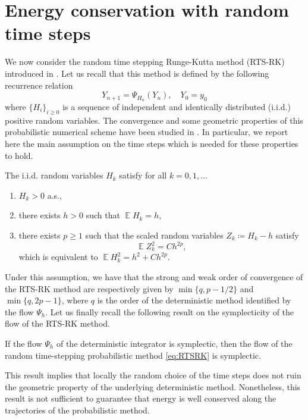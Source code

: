 \documentclass{siamart1116}
\numberwithin{theorem}{section}
\newcommand{\defeq}{\coloneqq}
\newcommand{\E}{\operatorname{\mathbb{E}}}
\begin{document}
\section{Energy conservation with random time steps}\label{sec:RTSBEA} We now consider the random time stepping Runge-Kutta method (RTS-RK) introduced in \cite{AbG18}. Let us recall that this method is defined by the following recurrence relation
\begin{equation}\label{eq:RTSRK}
	Y_{n+1} = \Psi_{H_n}(Y_n), \quad Y_0 = y_0
\end{equation}
where $\{H_i\}_{i\geq 0}$ is a sequence of independent and identically distributed (i.i.d.) positive random variables. The convergence and some geometric properties of this probabilistic numerical scheme have been studied in \cite{AbG18}. In particular, we report here the main assumption on the time steps which is needed for these properties to hold.
\begin{assumption}\label{as:AssumptionH} The i.i.d. random variables $H_k$ satisfy for all $k = 0, 1, \ldots$
	\begin{enumerate}
		\item\label{as:hStrong_Pos} $H_k > 0$ a.s.,
		\item\label{as:hStrong_E} there exists $h > 0$ such that $\E H_k = h$,
		\item\label{as:hStrong_Var} there exists $p \geq 1$ such that the scaled random variables $Z_k \defeq H_k - h$ satisfy
		\begin{equation}
		\E Z_k^2 = Ch^{2p},
		\end{equation}
		which is equivalent to $\E H_k^2 = h^2 + Ch^{2p}$.
	\end{enumerate}
\end{assumption}
Under this assumption, we have that the strong and weak order of convergence of the RTS-RK method are respectively given by $\min\{q, p-1/2\}$ and $\min\{q, 2p-1\}$, where $q$ is the order of the deterministic method identified by the flow $\Psi_h$. Let us finally recall the following result on the symplecticity of the flow of the RTS-RK method.
\begin{lemma}\label{lem:SympRTSRK} If the flow $\Psi_h$ of the deterministic integrator is symplectic, then the flow of the random time-stepping probabilistic method \eqref{eq:RTSRK} is symplectic.
\end{lemma}
This result implies that locally the random choice of the time steps does not ruin the geometric property of the underlying deterministic method. Nonetheless, this result is not sufficient to guarantee that energy is well conserved along the trajectories of the probabilistic method. 
\end{document}
